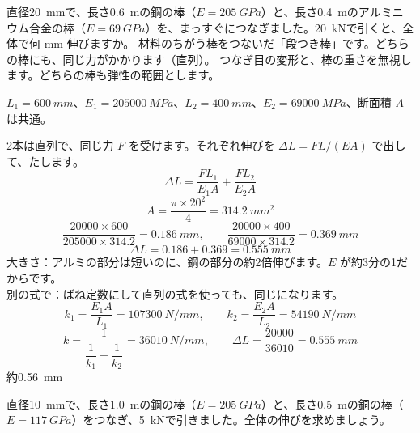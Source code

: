 \begin{phreidai}[鋼とアルミニウムをつないだ棒]
\label{ph:力-8:ex10}直径\qty{20}{mm}で、長さ\qty{0.6}{m}の鋼の棒（$E=\qty{205}{GPa}$）と、長さ\qty{0.4}{m}のアルミニウム合金の棒（$E=\qty{69}{GPa}$）を、まっすぐにつなぎました。\qty{20}{kN}で引くと、全体で何 mm 伸びますか。
\phbamen
材料のちがう棒をつないだ「段つき棒」です。どちらの棒にも、同じ力がかかります（直列）。
\phmushi
つなぎ目の変形と、棒の重さを無視します。どちらの棒も弾性の範囲とします。
\phzu
\noindent\begin{minipage}[c]{0.56\linewidth}\centering
{}
\end{minipage}\hfill
\begin{minipage}[c]{0.40\linewidth}\raggedright
$L_1=\qty{600}{mm}$、$E_1=\qty{205000}{MPa}$、$L_2=\qty{400}{mm}$、$E_2=\qty{69000}{MPa}$、断面積 $A$ は共通。
\end{minipage}
\phriyu
2本は直列で、同じ力 $F$ を受けます。それぞれ伸びを $\Delta L=FL/(EA)$ で出して、たします。
\phtateru
\[\Delta L=\frac{FL_1}{E_1A}+\frac{FL_2}{E_2A}\]
\phtoku
\[A=\frac{\pi\times20^2}{4}=\qty{314.2}{mm^2}\]
\[\frac{\num{20000}\times600}{\num{205000}\times314.2}=\qty{0.186}{mm},\qquad \frac{\num{20000}\times400}{\num{69000}\times314.2}=\qty{0.369}{mm}\]
\[\Delta L=0.186+0.369=\qty{0.555}{mm}\]
\phtashikame
大きさ：アルミの部分は短いのに、鋼の部分の約2倍伸びます。$E$ が約3分の1だからです。\\
別の式で：ばね定数にして直列の式を使っても、同じになります。
\[k_1=\frac{E_1A}{L_1}=\qty{107300}{N/mm},\qquad k_2=\frac{E_2A}{L_2}=\qty{54190}{N/mm}\]
\[k=\frac{1}{\dfrac{1}{k_1}+\dfrac{1}{k_2}}=\qty{36010}{N/mm},\qquad\Delta L=\frac{\num{20000}}{\num{36010}}=\qty{0.555}{mm}\]
\kotae 約\qty{0.56}{mm}
\end{phreidai}
\begin{jibun}
直径\qty{10}{mm}で、長さ\qty{1.0}{m}の鋼の棒（$E=\qty{205}{GPa}$）と、長さ\qty{0.5}{m}の銅の棒（$E=\qty{117}{GPa}$）をつなぎ、\qty{5}{kN}で引きました。全体の伸びを求めましょう。
\end{jibun}

